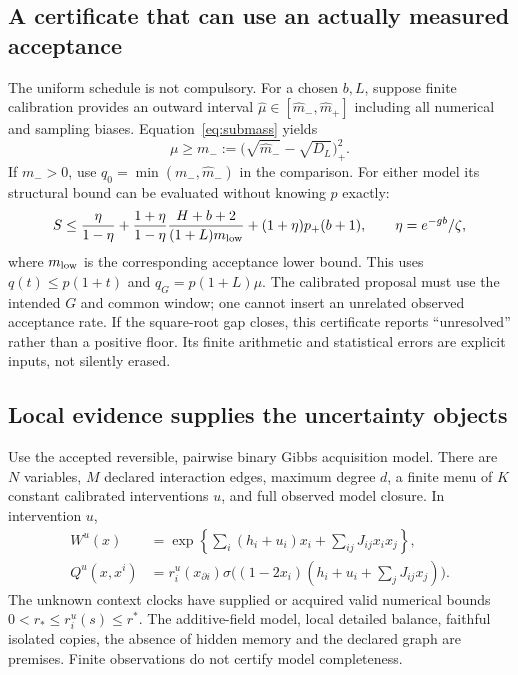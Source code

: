 \subsection{A certificate that can use an actually measured acceptance}
The uniform schedule is not compulsory. For a chosen $b,L$, suppose
finite calibration provides an outward interval
$\widehat\mu\in[\widehat m_-,\widehat m_+]$ including all numerical and
sampling biases. Equation~\eqref{eq:submass} yields
\begin{equation}
\mu\ge m_-:=
\bigl(\sqrt{\widehat m_-}-\sqrt{D_L}\bigr)_+^2.
\label{eq:observedAcceptance}
\end{equation}
If $m_->0$, use $q_0=\min(m_-,\widehat m_-)$ in the comparison.
For either model its structural bound can be evaluated without knowing
$p$ exactly:
\begin{equation}
S\le\frac{\eta}{1-\eta}
+\frac{1+\eta}{1-\eta}
\frac{H+b+2}{(1+L)m_{\rm low}}
+(1+\eta)p_+(b+1),\qquad \eta=e^{-gb}/\zeta,
\label{eq:instanceStructural}
\end{equation}
where $m_{\rm low}$ is the corresponding acceptance lower bound.
This uses $q(t)\le p(1+t)$ and $q_G=p(1+L)\mu$.
The calibrated proposal must use the intended $G$ and common window;
one cannot insert an unrelated observed acceptance rate. If the
square-root gap closes, this certificate reports ``unresolved'' rather
than a positive floor. Its finite arithmetic and statistical errors are
explicit inputs, not silently erased.

\subsection{Local evidence supplies the uncertainty objects}
Use the accepted reversible, pairwise binary Gibbs acquisition model.
There are $N$ variables, $M$ declared interaction edges, maximum degree
$d$, a finite menu of $K$ constant calibrated interventions $u$, and
full observed model closure. In intervention $u$,
\begin{align}
W^u(x)&=\exp\!\left\{\sum_i(h_i+u_i)x_i+
                         \sum_{ij}J_{ij}x_ix_j\right\},\\
Q^u(x,x^i)&=r_i^u(x_{\partial i})
\sigma\bigl((1-2x_i)(h_i+u_i+\sum_jJ_{ij}x_j)\bigr).
\end{align}
The unknown context clocks have supplied or acquired valid numerical
bounds $0<r_*\le r_i^u(s)\le r^*$. The additive-field model,
local detailed balance, faithful isolated copies, the absence of hidden
memory and the declared graph are premises. Finite observations do not
certify model completeness.


